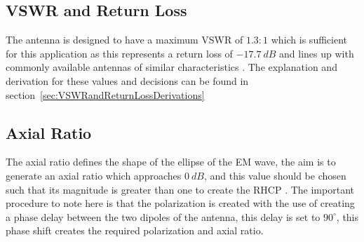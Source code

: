 \documentclass[11pt]{witseiepaper}
\begin{document}
\begin{bibunit}[witseie]
\subsection{VSWR and Return Loss} \label{sec:VSWRandReturnLoss}
The antenna is designed to have a maximum VSWR of $1.3:1$ which is sufficient for this application as this represents a return loss of $-17.7~dB$ and lines up with commonly available antennas of similar characteristics \cite{AntennaPrice1,AntennaPrice2,AntennaPrice3,AntennaPrice4}. The explanation and derivation for these values and decisions can be found in section~\ref{sec:VSWRandReturnLossDerivations}

\subsection{Axial Ratio} \label{sec:AxialRatio}
The axial ratio defines the shape of the ellipse of the EM wave, the aim is to generate an axial ratio which approaches $0~dB$, and this value should be chosen such that its magnitude is greater than one to create the RHCP \cite[p.~32]{crossedDipoleDesign}.
The important procedure to note here is that the polarization is created with the use of creating a phase delay between the two dipoles of the antenna, this delay is set to $90^{\circ}$, this phase shift creates the required polarization and axial ratio. 


\end{bibunit}
\end{document}
